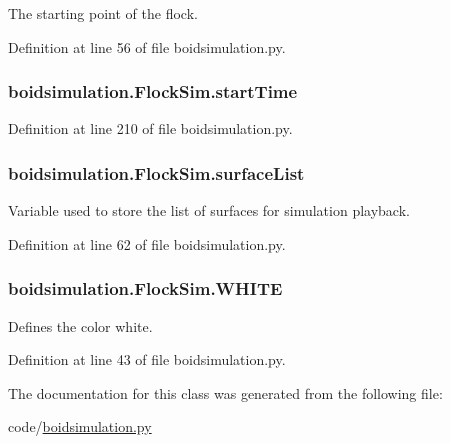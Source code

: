 The starting point of the flock. 



Definition at line 56 of file boidsimulation.\-py.

\hypertarget{classboidsimulation_1_1FlockSim_aea78473e0e592e48b6047f49f8254cc1}{
\subsubsection[{start\-Time}]{\setlength{\rightskip}{0pt plus 5cm}boidsimulation.\-Flock\-Sim.\-start\-Time}}\label{classboidsimulation_1_1FlockSim_aea78473e0e592e48b6047f49f8254cc1}


Definition at line 210 of file boidsimulation.\-py.

\hypertarget{classboidsimulation_1_1FlockSim_a60f47dc6f8186030cd22f3ca3b37c4e6}{
\subsubsection[{surface\-List}]{\setlength{\rightskip}{0pt plus 5cm}boidsimulation.\-Flock\-Sim.\-surface\-List}}\label{classboidsimulation_1_1FlockSim_a60f47dc6f8186030cd22f3ca3b37c4e6}


Variable used to store the list of surfaces for simulation playback. 



Definition at line 62 of file boidsimulation.\-py.

\hypertarget{classboidsimulation_1_1FlockSim_afe8d83a914aeae9d188cdf61053de56c}{
\subsubsection[{W\-H\-I\-T\-E}]{\setlength{\rightskip}{0pt plus 5cm}boidsimulation.\-Flock\-Sim.\-W\-H\-I\-T\-E}}\label{classboidsimulation_1_1FlockSim_afe8d83a914aeae9d188cdf61053de56c}


Defines the color white. 



Definition at line 43 of file boidsimulation.\-py.



The documentation for this class was generated from the following file\-:\begin{DoxyCompactItemize}
\item 
code/\hyperlink{boidsimulation_8py}{boidsimulation.\-py}\end{DoxyCompactItemize}
